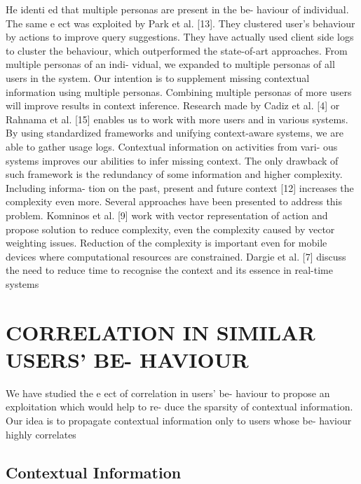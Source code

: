 \documentclass[10pt]{extarticle}
\begin{document}
\begin{multicols}{2}
He identi ed that multiple personas are present in the be-
haviour  of  individual.   The  same  e ect  was  exploited  by
Park et al. [13].  They clustered user's behaviour by actions
to improve query suggestions. They have actually used client
side logs to cluster the behaviour, which outperformed the
state-of-art approaches.  From multiple personas of an indi-
vidual, we expanded to multiple personas of all users in the
system.  Our intention is to supplement missing contextual
information using multiple personas.
Combining multiple personas of more users will improve
results in context inference. Research made by Cadiz et al. [4]
or Rahnama et al. [15] enables us to work with more users
and in various systems.  By using standardized frameworks
and unifying context-aware systems, we are able to gather
usage logs.  Contextual information on activities from vari-
ous systems improves our abilities to infer missing context.
The only drawback of such framework is the redundancy of
some information and higher complexity. Including informa-
tion on the past,  present and future context [12] increases
the  complexity  even  more.   Several  approaches  have  been
presented to address this problem.  Komninos et al. [9] work
with  vector  representation  of  action  and  propose  solution
to reduce complexity, even the complexity caused by vector
weighting issues.  Reduction of the complexity is important
even for mobile devices where computational resources are
constrained.  Dargie et al. [7] discuss the need to reduce time
to recognise the context and its essence in real-time systems

\section{CORRELATION IN SIMILAR USERS’ BE-
HAVIOUR}

We  have  studied  the  e ect  of  correlation  in  users'  be-
haviour to propose an exploitation which would help to re-
duce the sparsity of contextual information.  Our idea is to
propagate  contextual  information  only  to  users  whose  be-
haviour highly correlates

\subsection{Contextual Information}


\end{multicols}
\end{document}
